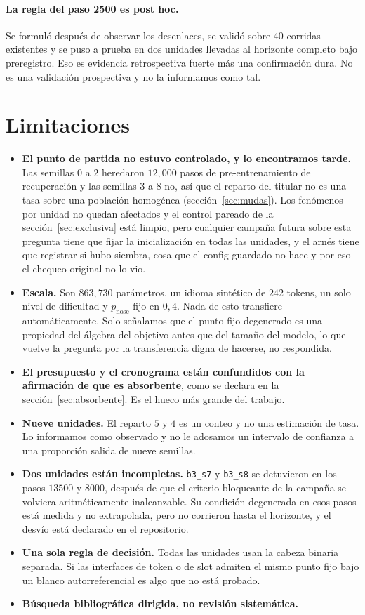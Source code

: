 \documentclass[11pt,a4paper]{article}
\begin{document}
\paragraph{La regla del paso 2500 es post hoc.} Se formuló después de observar los desenlaces, se
validó sobre $40$ corridas existentes y se puso a prueba en dos unidades llevadas al horizonte completo
bajo preregistro. Eso es evidencia retrospectiva fuerte más una confirmación dura. No es una validación
prospectiva y no la informamos como tal.

\section{Limitaciones}
\label{sec:limits}

\begin{itemize}
\item \textbf{El punto de partida no estuvo controlado, y lo encontramos tarde.} Las semillas $0$ a $2$
heredaron $12{,}000$ pasos de pre-entrenamiento de recuperación y las semillas $3$ a $8$ no, así que el
reparto del titular no es una tasa sobre una población homogénea (sección~\ref{sec:mudas}). Los
fenómenos por unidad no quedan afectados y el control pareado de la sección~\ref{sec:exclusiva} está
limpio, pero cualquier campaña futura sobre esta pregunta tiene que fijar la inicialización en todas las
unidades, y el arnés tiene que registrar si hubo siembra, cosa que el config guardado no hace y por eso
el chequeo original no lo vio.
\item \textbf{Escala.} Son $863{,}730$ parámetros, un idioma sintético de $242$ tokens, un solo nivel de
dificultad y $p_{\mathrm{nose}}$ fijo en $0{,}4$. Nada de esto transfiere automáticamente. Solo
señalamos que el punto fijo degenerado es una propiedad del álgebra del objetivo antes que del tamaño
del modelo, lo que vuelve la pregunta por la transferencia digna de hacerse, no respondida.
\item \textbf{El presupuesto y el cronograma están confundidos con la afirmación de que es absorbente},
como se declara en la sección~\ref{sec:absorbente}. Es el hueco más grande del trabajo.
\item \textbf{Nueve unidades.} El reparto $5$ y $4$ es un conteo y no una estimación de tasa. Lo
informamos como observado y no le adosamos un intervalo de confianza a una proporción salida de nueve
semillas.
\item \textbf{Dos unidades están incompletas.} \texttt{b3\_s7} y \texttt{b3\_s8} se detuvieron en los
pasos $13500$ y $8000$, después de que el criterio bloqueante de la campaña se volviera aritméticamente
inalcanzable. Su condición degenerada en esos pasos está medida y no extrapolada, pero no corrieron
hasta el horizonte, y el desvío está declarado en el repositorio.
\item \textbf{Una sola regla de decisión.} Todas las unidades usan la cabeza binaria separada. Si las
interfaces de token o de slot admiten el mismo punto fijo bajo un blanco autorreferencial es algo que
no está probado.
\item \textbf{Búsqueda bibliográfica dirigida, no revisión sistemática.}
\end{itemize}
\end{document}
